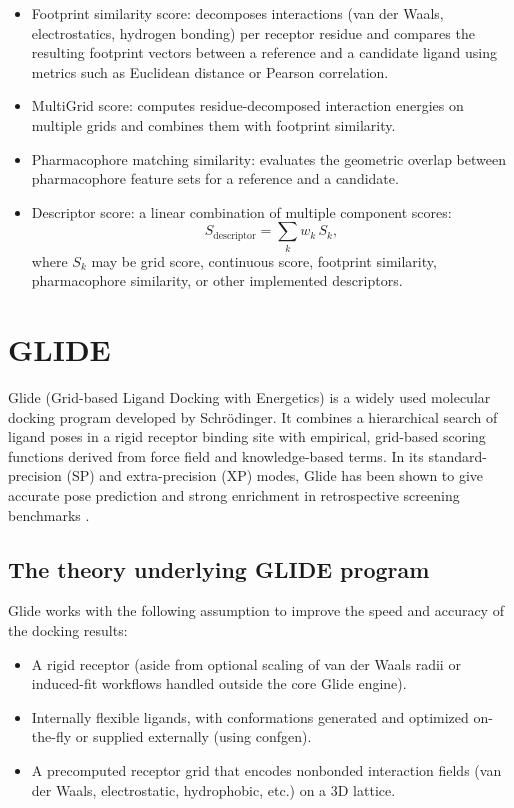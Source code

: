 \documentclass[12pt, a4paper]{article}
\begin{document}
\begin{enumerate}
\begin{itemize}
  \item Footprint similarity score: decomposes interactions (van der Waals, electrostatics, hydrogen bonding) per receptor residue and compares the resulting footprint vectors between a reference and a candidate ligand using metrics such as Euclidean distance or Pearson correlation.
  \item MultiGrid score: computes residue-decomposed interaction energies on multiple grids and combines them with footprint similarity.
  \item Pharmacophore matching similarity: evaluates the geometric overlap between pharmacophore feature sets for a reference and a candidate.
  \item Descriptor score: a linear combination of multiple component scores:
        \[
          S_{\text{descriptor}} =
            \sum_k w_k\, S_k,
        \]
        where $S_k$ may be grid score, continuous score, footprint similarity, pharmacophore similarity, or other implemented
        descriptors.
\end{itemize}
\end{enumerate}


\section{GLIDE}

Glide (Grid-based Ligand Docking with Energetics) is a widely used molecular docking program developed by Schr\"{o}dinger\cite{CH7_Friesner2004a,CH7_Friesner2004b}. It combines a hierarchical search of ligand poses in a rigid receptor binding site with empirical, grid-based scoring functions derived from force field and knowledge-based terms. In its standard-precision (SP) and extra-precision (XP) modes, Glide has been shown to give accurate pose prediction and strong enrichment in retrospective screening benchmarks \cite{CH7_Friesner2004a,CH7_Friesner2006,CH7_Friesner2004b}.


\subsection{The theory underlying GLIDE program}
Glide works with the following assumption to improve the speed and accuracy of the docking results:
\begin{itemize}
  \item A rigid receptor (aside from optional scaling of van der Waals radii or induced-fit workflows handled outside the core Glide engine).
  \item Internally flexible ligands, with conformations generated and optimized on-the-fly or supplied externally (using confgen\cite{CH7_confgen}).
  \item A precomputed receptor grid that encodes nonbonded interaction fields (van der Waals, electrostatic, hydrophobic, etc.) on a 3D lattice.
\end{itemize}
\end{document}
